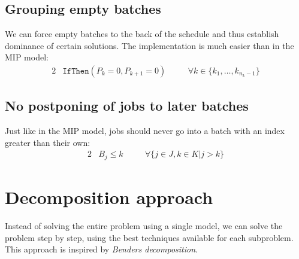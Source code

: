 \documentclass[13pt, letterpaper, oneside]{book}
\begin{document}
\begin{comment}
\subsection{Temporal constraints on a job's start date} Given any partial
assignment of jobs and an open job $j$, we can reason that \begin{alist}
\item{if the first batch with a due date later than the job is $k$, then the job
cannot be part of a batch after $k$---this would result in a non-EDD sequence
of batches.} \item{if the first batches up to $k-1$ offer not enough capacity
for $j$ due to the given partial assignment, then the job cannot be part of a
batch before $k$.} \end{alist} Since batches are \textit{not} dynamically
created like in Malapert's solution but fixed from the start, any partial
assignment that fails due to these constraints cannot be part of an optimal
solution.

This constraint is redundant with both the $(C_{k+1}\geq C_k)$ and
\texttt{packing} constraints, but may help accelerate the propagation in some
cases.
\end{comment}

\subsection{Grouping empty batches} We can force
empty batches to the back of the schedule and thus establish dominance of
certain solutions. The implementation is much easier than in the MIP model: 
\begin{alignat}{2} &
\mathtt{IfThen}( P_k = 0, P_{k+1} = 0 ) \quad && \forall k \in
\{k_1, \dots, k_{n_k-1}\}
\end{alignat}

\subsection{No postponing of jobs to later batches} Just like in the MIP model,
jobs should never go into a batch with an index greater than their own:
\begin{alignat}{2}
& B_j \leq k \quad && \forall \{j \in J, k \in K | j > k \}
\end{alignat}

\section{Decomposition approach}
Instead of solving the entire problem using a single model, we can solve the
problem step by step, using the best techniques available for each subproblem.
This approach is inspired by \textit{Benders decomposition}.
\end{document}
